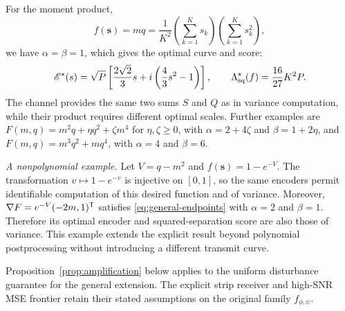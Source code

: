 For the moment product,
$$
 f(\mathbf s)=mq
 =\frac{1}{K^2}\left(\sum_{k=1}^K s_k\right)
 \left(\sum_{k=1}^K s_k^2\right),
$$
we have $\alpha=\beta=1$, which gives the optimal curve and score:
$$
 \mathscr E^\star(s)=\sqrt P\left[\frac{2\sqrt2}{3}s
 +i\left(\frac43s^2-1\right)\right],\qquad
 \Lambda_{\mathrm{sq}}^\star(f)=\frac{16}{27}K^2P.
$$
The channel provides the same two sums $S$ and $Q$ as in variance computation, while their product requires different optimal scales. Further examples are $F(m,q)=m^2q+\eta q^2+\zeta m^4$ for $\eta,\zeta\ge0$, with $\alpha=2+4\zeta$ and $\beta=1+2\eta$, and $F(m,q)=m^3q^2+mq^4$, with $\alpha=4$ and $\beta=6$.

\emph{A nonpolynomial example.} Let $V=q-m^2$ and $f(\mathbf s)=1-e^{-V}$. The transformation $v\mapsto1-e^{-v}$ is injective on $[0,1]$, so the same encoders permit identifiable computation of this desired function and of variance. Moreover, $\nabla F=e^{-V}(-2m,1)^\mathsf T$ satisfies \eqref{eq:general-endpoints} with $\alpha=2$ and $\beta=1$. Therefore its optimal encoder and squared-separation score are also those of variance. This example extends the explicit result beyond polynomial postprocessing without introducing a different transmit curve.

Proposition~\ref{prop:amplification} below applies to the uniform disturbance guarantee for the general extension. The explicit strip receiver and high-SNR MSE frontier retain their stated assumptions on the original family $f_{\phi,\psi}$.
